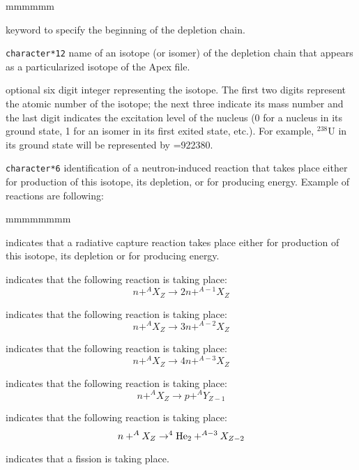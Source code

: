 \begin{ListeDeDescription}{mmmmmm}

\item[\moc{CHAIN}] keyword to specify the beginning of the depletion chain.

\item[\dusa{NAMDPL}] {\tt character*12} name of an isotope (or isomer) of the
depletion chain that appears as a particularized isotope of the Apex file.

\item[\dusa{izae}] optional six digit integer representing the isotope. The first two
digits represent the atomic number of the isotope; the next three indicate its
mass number and the last digit indicates the  excitation level of the nucleus (0
for a nucleus in its ground state, 1 for an isomer in its first exited state,
etc.). For example, $^{238}$U in its ground state will be represented by
=922380.

\item[\dusa{reaction}] {\tt character*6} identification of a neutron-induced
reaction that takes place either for production of this isotope, its depletion,
or for producing energy. Example of reactions are following:

\begin{ListeDeDescription}{mmmmmmmm}
\item[\moc{NG}] indicates that a radiative capture reaction takes place either
for production of this isotope, its depletion or for producing energy.

\item[\moc{N2N}] indicates that the following reaction is taking place:
$$ n +^{A}X_Z \to 2 n + ^{A-1}X_Z$$

\item[\moc{N3N}] indicates that the following reaction is taking place:
$$ n +^{A}X_Z \to 3 n + ^{A-2}X_Z$$

\item[\moc{N4N}] indicates that the following reaction is taking place:
$$ n +^{A}X_Z \to 4 n + ^{A-3}X_Z$$

\item[\moc{NP}] indicates that the following reaction is taking place:
$$ n +^{A}X_Z \to p + ^AY_{Z-1}$$

\item[\moc{NA}] indicates that the following reaction is taking place:
$$ n +^{A}X_Z \to ^4{\rm He}_2 + ^{A-3}X_{Z-2}$$

\item[\moc{NFTOT}] indicates that a fission is taking place.
\end{ListeDeDescription}


\end{ListeDeDescription}
